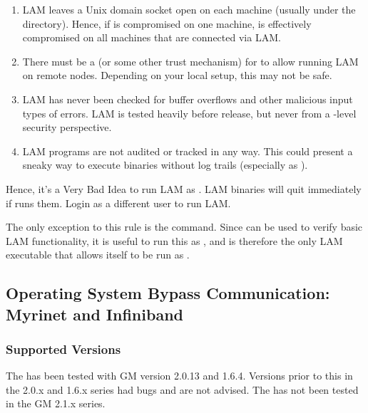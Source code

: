 \begin{enumerate}
\item LAM leaves a Unix domain socket open on each machine (usually
  under the  directory).  Hence, if  is
  compromised on one machine,  is effectively compromised
  on all machines that are connected via LAM.
  
\item There must be a  (or some other trust mechanism)
  for  to allow running LAM on remote nodes.  Depending on
  your local setup, this may not be safe.
  
\item LAM has never been checked for buffer overflows and other
  malicious input types of errors.  LAM is tested heavily before
  release, but never from a -level security perspective.
  
\item LAM programs are not audited or tracked in any way.  This could
  present a sneaky way to execute binaries without log trails
  (especially as ).
\end{enumerate}
  
Hence, it's a Very Bad Idea to run LAM as .  LAM binaries
will quit immediately if  runs them.  Login as a different
user to run LAM.

The only exception to this rule is the  command.  Since
 can be used to verify basic LAM functionality, it is
useful to run this as , and is therefore the only LAM
executable that allows itself to be run as .




\subsection{Operating System Bypass Communication: Myrinet and
  Infiniband}
\label{release-notes:os-bypass}


\subsubsection{Supported Versions}

The   has been tested with GM version 2.0.13 and
1.6.4.  Versions prior to this in the 2.0.x and 1.6.x series had bugs
and are not advised.  The   has not been tested in
the GM 2.1.x series.

